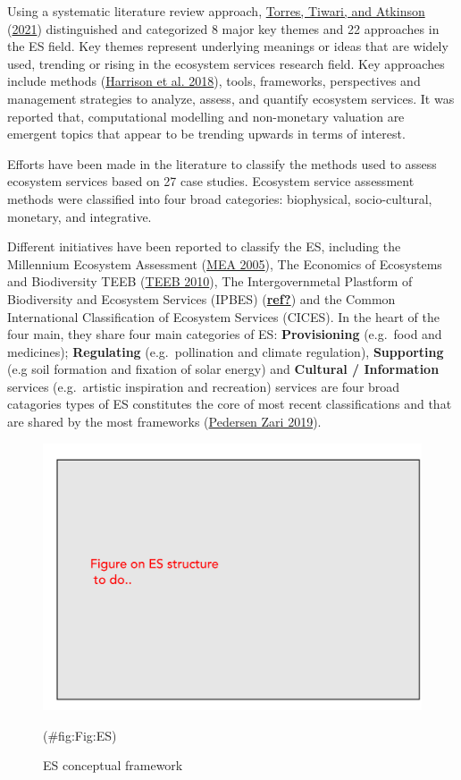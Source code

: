 \documentclass[
]{article}
\begin{document}
Using a systematic literature review approach, \protect\hyperlink{ref-Torres2021}{Torres, Tiwari, and Atkinson} (\protect\hyperlink{ref-Torres2021}{2021}) distinguished and categorized 8 major key themes and 22 approaches in the ES field. Key themes represent underlying meanings or ideas that are widely used, trending or rising in the ecosystem services research field.
Key approaches include methods (\protect\hyperlink{ref-Harrison2018}{Harrison et al. 2018}), tools, frameworks, perspectives and management strategies to analyze, assess, and quantify ecosystem services.
It was reported that, computational modelling and non-monetary valuation are emergent topics that appear to be trending upwards in terms of interest.

Efforts have been made in the literature to classify the methods used to assess ecosystem services based on 27 case studies. Ecosystem service assessment methods were classified into four broad categories: biophysical, socio-cultural, monetary, and integrative.

Different initiatives have been reported to classify the ES, including the Millennium Ecosystem Assessment (\protect\hyperlink{ref-MEA2005}{MEA 2005}),
The Economics of Ecosystems and Biodiversity TEEB (\protect\hyperlink{ref-TEEB2010}{TEEB 2010}),
The Intergovernmetal Plastform of Biodiversity and Ecosystem Services (IPBES) (\protect\hyperlink{ref-ref}{\textbf{ref?}}) and the Common International Classification of Ecosystem Services (CICES).
In the heart of the four main, they share four main categories of ES:
\textbf{Provisioning} (e.g.~food and medicines);
\textbf{Regulating} (e.g.~pollination and climate regulation),
\textbf{Supporting} (e.g soil formation and fixation of solar energy) and
\textbf{Cultural / Information} services (e.g.~artistic inspiration and recreation) services are four broad catagories types of ES constitutes the core of most recent classifications and that are shared by the most frameworks (\protect\hyperlink{ref-PedersenZari2019}{Pedersen Zari 2019}).

\begin{figure}[!ht]

{\centering \includegraphics[width=1\linewidth]{Figures/Comparison} 

}

\caption{ES conceptual framework}(\#fig:Fig:ES)
\end{figure}
\end{document}
